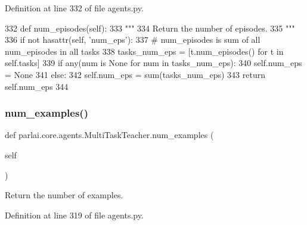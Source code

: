 Definition at line 332 of file agents.\+py.


\begin{DoxyCode}
332     \textcolor{keyword}{def }num\_episodes(self):
333         \textcolor{stringliteral}{"""}
334 \textcolor{stringliteral}{        Return the number of episodes.}
335 \textcolor{stringliteral}{        """}
336         \textcolor{keywordflow}{if} \textcolor{keywordflow}{not} hasattr(self, \textcolor{stringliteral}{'num\_eps'}):
337             \textcolor{comment}{# num\_episodes is sum of all num\_episodes in all tasks}
338             tasks\_num\_eps = [t.num\_episodes() \textcolor{keywordflow}{for} t \textcolor{keywordflow}{in} self.tasks]
339             \textcolor{keywordflow}{if} any(num \textcolor{keywordflow}{is} \textcolor{keywordtype}{None} \textcolor{keywordflow}{for} num \textcolor{keywordflow}{in} tasks\_num\_eps):
340                 self.num\_eps = \textcolor{keywordtype}{None}
341             \textcolor{keywordflow}{else}:
342                 self.num\_eps = sum(tasks\_num\_eps)
343         \textcolor{keywordflow}{return} self.num\_eps
344 
\end{DoxyCode}
\mbox{\label{classparlai_1_1core_1_1agents_1_1MultiTaskTeacher_a21fa6d0565bd35e54a74806ecca62e34}} 
\subsubsection{\texorpdfstring{num\+\_\+examples()}{num\_examples()}}
{\footnotesize\ttfamily def parlai.\+core.\+agents.\+Multi\+Task\+Teacher.\+num\+\_\+examples (\begin{DoxyParamCaption}\item[{}]{self }\end{DoxyParamCaption})}

\begin{DoxyVerb}Return the number of examples.
\end{DoxyVerb}
 

Definition at line 319 of file agents.\+py.


